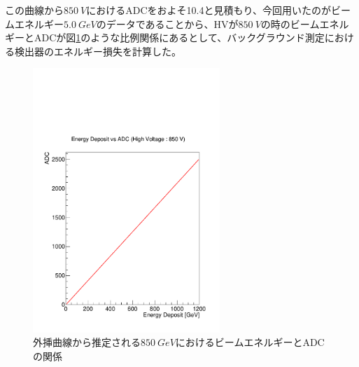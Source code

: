 この曲線から$\SI{850}{V}$におけるADCをおよそ10.4と見積もり、今回用いたのがビームエネルギー$\SI{5.0}{GeV}$のデータであることから、HVが$\SI{850}{V}$の時のビームエネルギーとADCが図\ref{ADC_energy}のような比例関係にあるとして、バックグラウンド測定における検出器のエネルギー損失を計算した。%
\begin{figure}[H]
	\begin{center}
		\includegraphics[width=200pt]{./Figure/EBESAnalysis/ADC_energy.pdf}
		\caption[外挿曲線から推定される$\SI{850}{GeV}$におけるビームエネルギーとADCの関係]{外挿曲線から推定される$\SI{850}{GeV}$におけるビームエネルギーとADCの関係}
		\label{ADC_energy}
	\end{center}
\end{figure}




